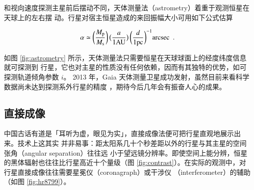 和视向速度探测主星前后摆动不同，天体测量法（astrometry）着重于观测恒星在天球上的左右摆
动。行星对宿主恒星造成的来回振幅大小可用如下公式估算

\begin{equation}  \label{eq:astrometry} 
\alpha \simeq \bigg(\frac{M_\tif{p}}{M_\tif{s}}\bigg) \, \big(\frac{a}{1 \tif{AU}}\big) \, \bigg(\frac{d}{1 \tif{pc}}\bigg)^{-1} \tif{arcsec} \ \ .
\end{equation} %

如图 \ref{fig:astrometry} 所示，天体测量法只需要恒星在天球球面上的经度纬度信息就可探测到
行星，它也对主星的性质没有任何依赖，因而有其独特的优势，如可探测轨道倾角参数 $i$。
2013 年，Gaia 天体测量卫星成功发射，虽然目前来看科学数据尚未达到探测系外行星的精度
\cite{GaiaCo2016}，期待今后几年会有振奋人心的成果。


\subsection{直接成像}  \label{sec:drctimgmeth}
中国古话有道是「耳听为虚，眼见为实」，直接成像法便可把行星直观地展示出来。技术上这其实
并非易事：距太阳系几十个秒差距以外的行星与其主星的空间张角（angular separation）往往远
小于望远镜分辨率。即使空间上能分辨，恒星的黑体辐射也往往比行星高近十个量级（图 
\ref{fig:contrast}）。在实际的观测中，对行星直接成像往往需要星冕仪（coronagraph）或干涉仪
（interferometer）的辅助（如图 \ref{fig:hr8799}）。

